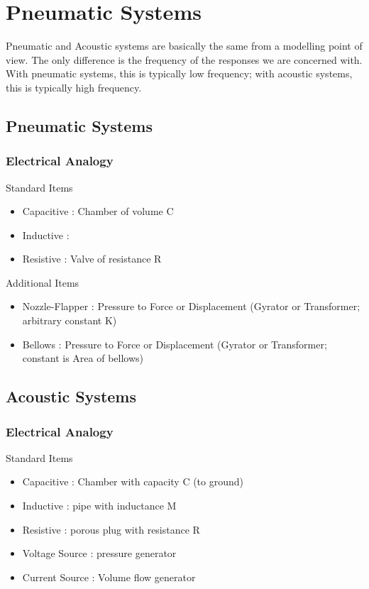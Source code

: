 \documentclass{../templates/topic}
\begin{document}
\chapter{Pneumatic Systems}

Pneumatic and Acoustic systems are basically the same from a modelling point of view. The only difference is the frequency of the responses we are concerned with. With pneumatic systems, this is typically low frequency; with acoustic systems, this is typically high frequency.

\section{Pneumatic Systems}

\subsection{Electrical Analogy}
Standard Items
\begin{itemize}
	\item Capacitive : Chamber of volume C
	\item Inductive :
	\item Resistive : Valve of resistance R
\end{itemize}
Additional Items
\begin{itemize}
	\item Nozzle-Flapper : Pressure to Force or Displacement (Gyrator or Transformer; arbitrary constant K)
	\item Bellows : Pressure to Force or Displacement (Gyrator or Transformer; constant is Area of bellows)
\end{itemize}

\section{Acoustic Systems}

\subsection{Electrical Analogy}
Standard Items
\begin{itemize}
	\item Capacitive : Chamber with capacity C (to ground)
	\item Inductive : pipe with inductance M
	\item Resistive : porous plug with resistance R
	\item Voltage Source : pressure generator
	\item Current Source : Volume flow generator
\end{itemize}
\end{document}
